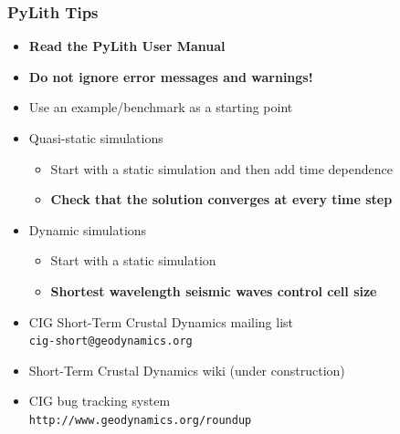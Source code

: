 \documentclass{beamer}
\newcommand{\important}[1]{{\bf\color{red}#1}}
\begin{document}
\begin{frame}
  \frametitle{PyLith Tips}
  \summary{}
 
  \begin{itemize}
  \item \important{Read the PyLith User Manual}
  \item \important{Do not ignore error messages and warnings!}
  \item Use an example/benchmark as a starting point
  \item Quasi-static simulations
    \begin{itemize}
    \item Start with a static simulation and then add time dependence
    \item \important{Check that the solution converges at every time step}
    \end{itemize}
  \item Dynamic simulations
    \begin{itemize}
    \item Start with a static simulation
    \item \important{Shortest wavelength seismic waves control cell size}
    \end{itemize}
  \item CIG Short-Term Crustal Dynamics mailing list\\
    {\tt cig-short@geodynamics.org}
  \item Short-Term Crustal Dynamics wiki (under construction)
  \item CIG bug tracking system\\
    {\tt http://www.geodynamics.org/roundup}
  \end{itemize}

\end{frame}
\end{document}
